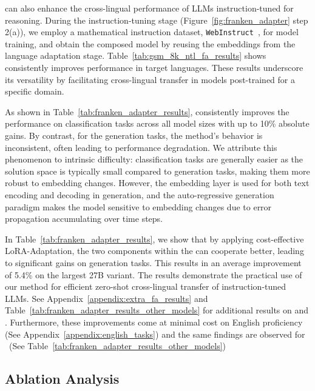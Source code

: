 \ouradapter can also enhance the cross-lingual performance of LLMs instruction-tuned for reasoning. During the instruction-tuning stage (Figure~\ref{fig:franken_adapter} step 2(a)), we employ a mathematical instruction dataset, \texttt{WebInstruct}~\citep{yue2024mammoth}, for model training, and obtain the composed model by reusing the embeddings from the language adaptation stage. Table~\ref{tab:gsm_8k_ntl_fa_results} shows \ouradapter consistently improves performance in target languages. These results underscore its versatility by facilitating cross-lingual transfer in models post-trained for a specific domain.

As shown in Table~\ref{tab:franken_adapter_results}, \ouradapter consistently improves the performance on classification tasks across all model sizes with up to 10\% absolute gains. By contrast, for the generation tasks, the method's behavior is inconsistent, often leading to performance degradation. We attribute this phenomenon to intrinsic difficulty: classification tasks are generally easier as the solution space is typically small compared to generation tasks, making them more robust to embedding changes. However, the embedding layer is used for both text encoding and decoding in generation, and the auto-regressive generation paradigm makes the model sensitive to embedding changes due to error propagation accumulating over time steps.


In Table~\ref{tab:franken_adapter_results}, we show that by applying cost-effective LoRA-Adaptation, the two components within the \ouradapter can cooperate better, leading to significant gains on generation tasks. This results in an average improvement of 5.4\% on the largest 27B variant. The results demonstrate the practical use of our \ouradapter method for efficient zero-shot cross-lingual transfer of instruction-tuned LLMs. See Appendix~\ref{appendix:extra_fa_results} and Table~\ref{tab:franken_adapter_results_other_models} for additional results on \aya and \palmtwo. Furthermore, these improvements come at minimal cost on English proficiency (See Appendix~\ref{appendix:english_tasks}) and the same findings are observed for \aya \ \etc (See Table~\ref{tab:franken_adapter_results_other_models})

\subsection{Ablation Analysis}

